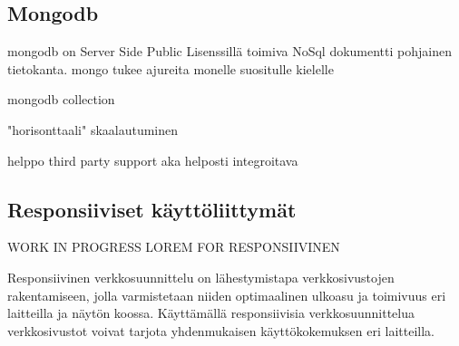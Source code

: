 \documentclass[11pt,a4paper,titlepage,oneside]{article}
\begin{document}
\newpage












\newpage
\subsection{Mongodb}





mongodb on Server Side Public Lisenssillä toimiva NoSql dokumentti pohjainen tietokanta.%
mongo tukee ajureita monelle suositulle kielelle

mongodb collection

"horisonttaali" skaalautuminen

helppo third party support
aka helposti integroitava





\subsection{Responsiiviset käyttöliittymät}


WORK IN PROGRESS LOREM FOR RESPONSIIVINEN
\medskip


Responsiivinen verkkosuunnittelu on lähestymistapa verkkosivustojen rakentamiseen, jolla varmistetaan niiden optimaalinen ulkoasu ja toimivuus eri laitteilla ja näytön koossa.
Käyttämällä responsiivisia verkkosuunnittelua verkkosivustot voivat tarjota yhdenmukaisen käyttökokemuksen eri laitteilla.
\medskip
\end{document}
